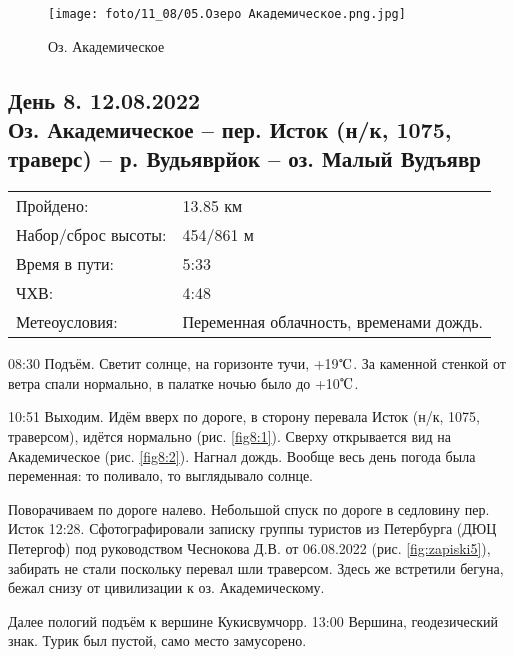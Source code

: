 \begin{figure}
    \centering
    \texttt{[image: foto/11\_08/05.Озеро Академическое.png.jpg]}
    \caption{Оз. Академическое}
    \label{fig7:5}
\end{figure}

\FloatBarrier

\subsection{День 8. 12.08.2022\\
Оз. Академическое -- пер. Исток (н/к, 1075, траверс) -- р. Вудьяврйок -- оз. Малый Вудъявр}
\begin{tabular}{l p{12cm}}
\hline
Пройдено: & 13.85 км\\
Набор/сброс высоты: & 454/861 м\\
Время в пути: & 5:33\\
ЧХВ: & 4:48\\
Метеоусловия: & Переменная облачность, временами дождь.\\
\hline
\end{tabular}

08:30 Подъём. Светит солнце, на горизонте тучи, +19$\tccentigrade$.
За каменной стенкой от ветра спали нормально, в палатке ночью было до +10$\tccentigrade$.

10:51 Выходим. Идём вверх по дороге, в сторону перевала Исток (н/к, 1075, траверсом), идётся нормально (рис. \ref{fig8:1}).
Сверху открывается вид на Академическое (рис. \ref{fig8:2}).
Нагнал дождь. Вообще весь день погода была переменная: то поливало, то выглядывало солнце.

Поворачиваем по дороге налево. Небольшой спуск по дороге в седловину пер. Исток 12:28.
Сфотографировали записку группы туристов из Петербурга (ДЮЦ Петергоф) под руководством Чеснокова Д.В. от 06.08.2022
(рис. \ref{fig:zapiski5}),
забирать не стали поскольку перевал шли траверсом. Здесь же встретили бегуна, бежал снизу от цивилизации к оз. Академическому.

Далее пологий подъём к вершине Кукисвумчорр.
13:00 Вершина, геодезический знак. Турик был пустой, само место замусорено.

